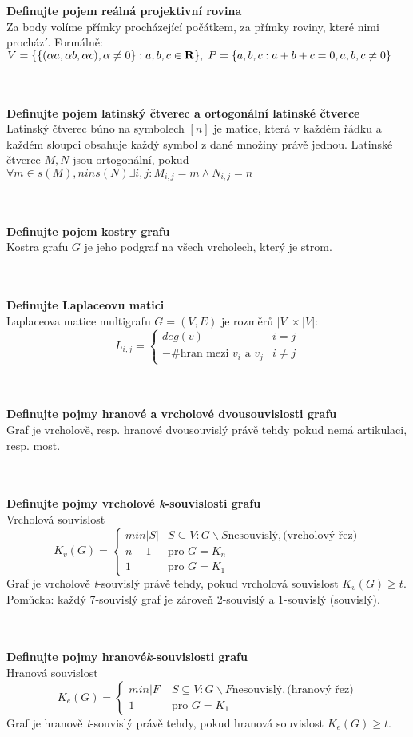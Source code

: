\documentclass[a4paper]{article}
\newcommand{\hlava}[1]{\text{} \\ \text{} \\ \text{} \hspace{-0.27cm} \textbf{#1} \\}
\newcommand{\str}[1]{\hspace{0.05cm} \fbox{s. #1} }
\begin{document}
\hlava{Definujte pojem reálná projektivní rovina}
Za body volíme přímky procházející počátkem, za přímky roviny, které nimi prochází. Formálně: $V = \{\{(\alpha a, \alpha b, \alpha c), \alpha \ne 0\}: a, b, c \in \mathbf{R}\}, \hspace{0.1cm} P = \{ a, b, c: a+b+c=0, a, b, c \ne 0\}$ \str{10}

\hlava{Definujte pojem latinský čtverec a ortogonální latinské čtverce}
Latinský čtverec búno na symbolech $[n]$ je matice, která v každém řádku a každém sloupci obsahuje každý symbol z dané množiny právě jednou. Latinské čtverce $M, N$ jsou ortogonální, pokud $\forall m \in s(M), n in s(N) \exists i,j: M_{i,j} = m \wedge N_{i,j} = n$ \str{10}

\hlava{Definujte pojem kostry grafu}
Kostra grafu $G$ je jeho podgraf na všech vrcholech, který je strom. \str{13}

\hlava{Definujte Laplaceovu matici}
Laplaceova matice multigrafu $G = (V, E)$ je rozměrů $|V| \times |V|$:  \[ L_{i,j}= \begin{cases} 
	deg(v) & i=j \\
	-\# \text{hran mezi $v_i$ a $v_j$} & i \ne j \end{cases} \] \str{16}
	
\hlava{Definujte pojmy hranové a vrcholové dvousouvislosti grafu}
Graf je vrcholově, resp. hranové dvousouvislý právě tehdy pokud nemá artikulaci, resp. most. \str{17}

\hlava{Definujte pojmy vrcholové \textit{k}-souvislosti grafu}
Vrcholová souvislost \[ K_v(G) = 
\begin{cases}
	min |S| & S \subseteq V: G \backslash S \text{nesouvislý}, \text{(vrcholový řez)} \\
	n-1 & \text{pro } G = K_n \\
	1 & \text{pro } G = K_1
\end{cases}
\]
Graf je vrcholově \textit{t}-souvislý právě tehdy, pokud vrcholová souvislost $K_v(G) \ge t$. Pomůcka: každý 7-souvislý graf je zároveň 2-souvislý a 1-souvislý (souvislý). \str{17}


\hlava{Definujte pojmy hranové\textit{k}-souvislosti grafu}
Hranová souvislost \[ K_e(G) = 
\begin{cases}
min |F| & S \subseteq V: G \backslash F \text{nesouvislý}, \text{(hranový řez)} \\
1 & \text{pro } G = K_1
\end{cases}
\]
Graf je hranově \textit{t}-souvislý právě tehdy, pokud hranová souvislost $K_e(G) \ge t$. \str{17}
\end{document}
